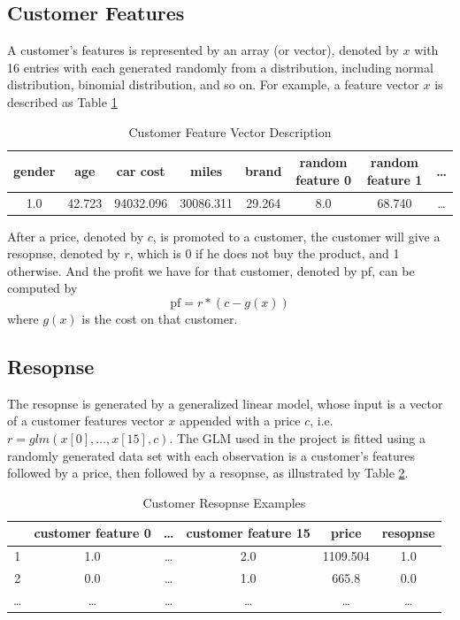 \documentclass{article}
\begin{document}
\subsection{Customer Features}
\noindent A customer's features is represented by an array (or vector), denoted 
by \(x\) with 16 entries with each generated randomly from a distribution, 
including normal distribution, binomial distribution, and so on. For example, 
a feature vector \(x\) is described as Table \ref{tab:feature-vector}
\begin{table}
    \caption[Table]{
        Customer Feature Vector Description\label{tab:feature-vector}
    }
    \centering
    \begin{tabular}{c|c|c|c|c|c|c|c}
        gender & age & car cost & miles & brand & random feature 0 & random 
        feature 1 & \dots\\
        \hline
        1.0 & 42.723 & 94032.096 & 30086.311 & 29.264 & 8.0 & 68.740 & \dots
    \end{tabular}
\end{table}

\noindent After a price, denoted by \(c\), is promoted to a customer, the 
customer will give a resopnse, denoted by \(r\), which is 0 if he does not buy
the product, and 1 otherwise. And the profit we have for that customer, 
denoted by pf, can be computed by
\[\text{pf} = r*\left(c - g(x)\right)\]
where \(g(x)\) is the cost on that customer.

\subsection{Resopnse}
\noindent The resopnse is generated by a generalized linear model, whose input 
is a vector of a customer features vector \(x\) appended with a price \(c\), 
i.e. \(r=glm(x[0], \dots, x[15], c)\).
\vspace{3mm}\newline The GLM used in the project is fitted using a randomly
generated data set with each observation is a customer's features followed by 
a price, then followed by a resopnse, as illustrated by 
Table \ref{tab:response}.
\begin{table}[H]
    \caption[Table]{
        Customer Resopnse Examples\label{tab:response}
    }
    \centering
    \begin{tabular}{c|c|c|c|c|c}
        & customer feature 0 & \dots & customer feature 15 & price & resopnse\\
        \hline
        1 & 1.0 & \dots & 2.0 & 1109.504 & 1.0\\
        \hline
        2 & 0.0 & \dots & 1.0 & 665.8 & 0.0\\
        \hline
        \dots & \dots & \dots & \dots & \dots & \dots
    \end{tabular}
\end{table}
\end{document}
